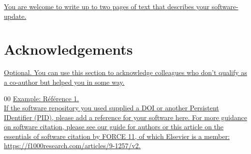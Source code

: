\documentclass[preprint,12pt, a4paper]{elsarticle}
\begin{document}
\uline{You are welcome to write up to two pages of text that describes your software-update. } 


\section*{Acknowledgements}
\label{acknowledgements}
\uline{Optional. You can use this section to acknowledge colleagues who don’t qualify as a co-author but helped you in some way.}  



\begin{thebibliography}{00}
\bibitem{}
\uline{Example: Référence 1.\\ If the software repository you used supplied a DOI or another Persistent IDentifier (PID), please add a reference for your software here. For more guidance on software citation, please see our guide for authors or this article on the essentials of software citation by FORCE 11, of which Elsevier is a member: \url{https://f1000research.com/articles/9-1257/v2.}}

\end{thebibliography}
\end{document}
